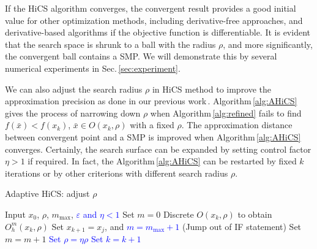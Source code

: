 \documentclass[final,1p,times]{elsarticle}
\begin{document}
If the HiCS algorithm converges, the convergent result provides a
good initial value for other optimization methods, including
derivative-free approaches, and derivative-based algorithms if the
objective function is differentiable. 
It is evident that the search space is shrunk to a ball with
the radius $\rho$, and more significantly, the convergent ball
contains a SMP.
We will demonstrate this by several numerical experiments in
Sec.\,\ref{sec:experiment}.

We can also adjust the search radius $\rho$ in HiCS method 
to improve the approximation precision as done in our previous
work\,\cite{huang2017hill}. Algorithm\,\ref{alg:AHiCS} gives the
process of narrowing down $\rho$ when Algorithm\,\ref{alg:refined} fails
to find $f(\bar{x})<f(x_k)$, $\bar{x}\in O(x_k, \rho)$ with a fixed $\rho$.
The approximation distance between convergent point and a SMP is
improved when Algorithm\,\ref{alg:AHiCS} converges.
Certainly, the search surface can be expanded by setting
control factor $\eta>1$ if required. 
In fact, the Algorithm\,\ref{alg:AHiCS} can be restarted by
fixed $k$ iterations or by other criterions
with different search radius $\rho$.

%
%
\begin{algorithm}[H]
	\caption{Adaptive HiCS: adjust $\rho$}
	\label{alg:AHiCS}
\begin{algorithmic}[1]
	\STATE Input $x_0$, $\rho$, $m_{\max}$,
	\textcolor{blue}{$\varepsilon$ and $\eta<1$}
	\IF { \textcolor{blue}{ $\rho>\varepsilon$}}
		\STATE Set $m=0$
			\STATE Discrete $O(x_k,\rho)$ to obtain $O^m_h(x_k,\rho)$
			\STATE Set $x_{k+1}=x_j$, 
				and \textcolor{blue}{$m=m_{\max}+1$} (Jump out of IF statement) 
			\ELSE
				\STATE Set $m = m+1$
			\ENDIF
		\ELSE
			\STATE \textcolor{blue}{ Set $\rho=\eta\rho$}
		\ENDIF
		\STATE \textcolor{blue}{Set $k=k+1$}
	\ENDFOR
\ENDIF
\end{algorithmic}
\end{algorithm}
\end{document}
